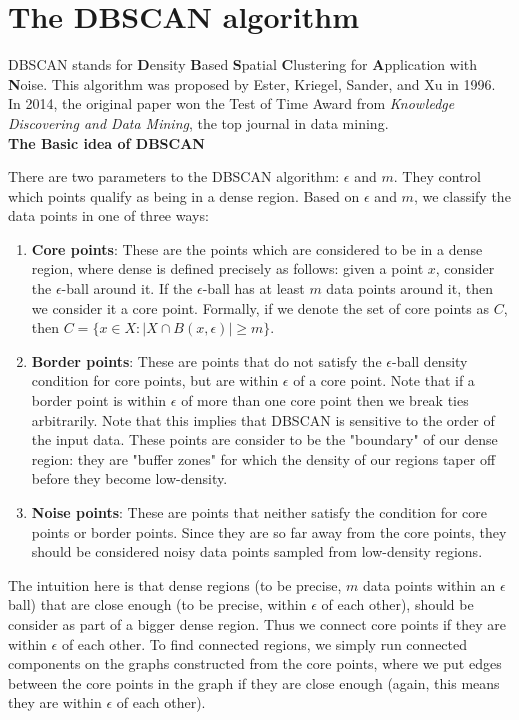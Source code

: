 \section{The DBSCAN algorithm}
  DBSCAN stands for \textbf{D}ensity \textbf{B}ased \textbf{S}patial
  \textbf{C}lustering  for \textbf{A}pplication with \textbf{N}oise. This
  algorithm was proposed by Ester, Kriegel, Sander, and Xu in 1996. In 2014,
  the original paper won the Test of Time Award from \textit{Knowledge Discovering and Data Mining},
  the top journal in data mining.\\

  \noindent\textbf{The Basic idea of DBSCAN}
  
  There are two parameters to the DBSCAN algorithm: $\epsilon$ and $m$. They control 
  which points qualify as being in a dense region. Based on $\epsilon$
  and $m$, we classify the data points in one of three ways:

  \begin{enumerate}
  \item \textbf{Core points}: These are the points which are considered to be in a
  dense region, where dense is defined precisely as follows: given a point $x$,
  consider the $\epsilon$-ball around it. If the $\epsilon$-ball has
  at least $m$ data points around it, then we consider it a core point. Formally,
  if we denote the set of core points as $C$, then $C=\{x \in X: |X \cap B(x,\epsilon)|\geq m\}$.
  \item \textbf{Border points}: These are points that do not satisfy the $\epsilon$-ball
  density condition for core points, but are within $\epsilon$ of a core point.
  Note that if a border point is within $\epsilon$ of more than one core point
  then we break ties arbitrarily. Note that this implies that DBSCAN is sensitive
  to the order of the input data. These points are consider to be the "boundary"
  of our dense region: they are "buffer zones" for which the density of our regions
  taper off before they become low-density.
  \item \textbf{Noise points}: These are points that neither satisfy the condition for
  core points or border points. Since they are so far away from the core points,
  they should be considered noisy data points sampled from low-density regions.
  \end{enumerate}

  The intuition here is that dense regions (to be precise, $m$ data points within
  an $\epsilon$ ball) that are close enough (to be precise, within $\epsilon$ of each other),
  should be consider as part of a bigger dense region. Thus we connect core
  points if they are within $\epsilon$ of each other. To find connected regions,
  we simply run connected components on the graphs constructed from the core
  points, where we put edges between the core points in the graph if they are
  close enough (again, this means they are within $\epsilon$ of each other).

